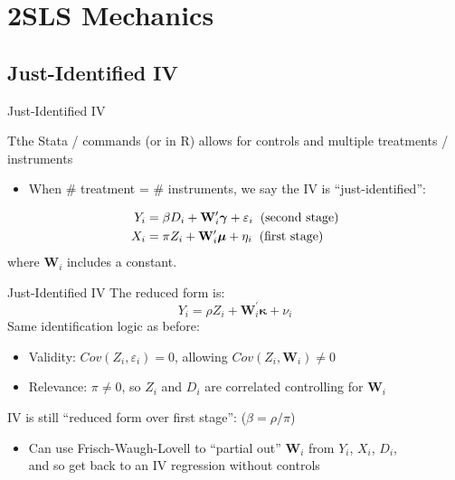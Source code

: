 \documentclass{beamer}
\begin{document}
\section{2SLS Mechanics}

\subsection{Just-Identified IV}
\begin{frame}{Just-Identified IV}

Tthe Stata / commands (or  in R) allows for controls and multiple treatments / instruments
\begin{itemize}
  \item When \# treatment = \# instruments, we say the IV is ``just-identified'':
\end{itemize}\pause\vspace{-0.7cm}

\begin{align*}
Y_i &=  \beta D_i +\mathbf{W}_i^\prime\boldsymbol{\gamma} +  \varepsilon_i\hspace{0.2cm}\text{(second stage)}\\
X_i &= \pi Z_i + \mathbf{W}_i^\prime\boldsymbol{\mu} + \eta_i\hspace{0.2cm}\text{(first stage)}
\end{align*}
where $\mathbf{W}_i$ includes a constant.
\end{frame}

\begin{frame}{Just-Identified IV}
The reduced form is: $$Y_i= \rho Z_i + \mathbf{W}_i^\prime\boldsymbol{\kappa}+\nu_i $$\pause
Same identification logic as before:

\begin{itemize}
  \item Validity: $Cov(Z_i,\varepsilon_i)=0$, allowing $Cov(Z_i,\mathbf{W}_i)\neq 0$\pause
  \item Relevance: $\pi\neq 0$, so $Z_i$ and $D_i$ are correlated controlling for $\mathbf{W}_i$
\end{itemize}\pause\medskip

IV is still ``reduced form over first stage'': ($\beta=\rho/\pi$)\pause\vspace{0.1cm}
\begin{itemize}
  \item Can use Frisch-Waugh-Lovell to ``partial out'' $\mathbf{W}_i$ from $Y_i$, $X_i$, $D_i$, \\ and so get back to an IV regression without controls
\end{itemize}
\end{frame}
\end{document}
